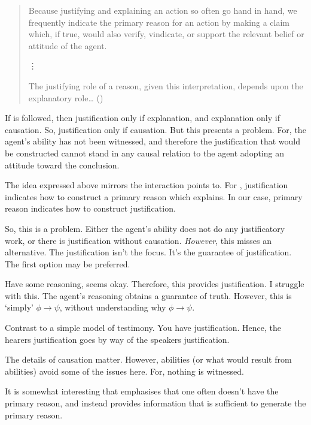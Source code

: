 \documentclass[10pt]{article}
\begin{document}
\begin{note}[Davidson]
  \begin{quote}
    Because justifying and explaining an action so often go hand in hand, we frequently indicate the primary reason for an action by making a claim which, if true, would also verify, vindicate, or support the relevant belief or attitude of the agent.

    \vdots

    The justifying role of a reason, given this interpretation, depends upon the explanatory role\dots
    \nolinebreak
    \mbox{}\hfill(\cite[8]{Davidson:2001aa})
  \end{quote}

  If \citeauthor{Davidson:2001aa} is followed, then justification only if explanation, and explanation only if causation.
  So, justification only if causation.
  But this presents a problem.
  For, the agent's ability has not been witnessed, and therefore the justification that would be constructed cannot stand in any causal relation to the agent adopting an attitude toward the conclusion.

  The idea expressed above mirrors the interaction \citeauthor{Davidson:2001aa} points to.
  For \citeauthor{Davidson:2001aa}, justification indicates how to construct a primary reason which explains.
  In our case, primary reason indicates how to construct justification.

  So, this is a problem.
  {
    \color{red}
    Either the agent's ability does not do any justificatory work, or there is justification without causation.
    \emph{However}, this misses an alternative.
    The justification isn't the focus.
    It's the guarantee of justification.
  }
  The first option may be preferred.

  Have some reasoning, seems okay.
  Therefore, this provides justification.
  I struggle with this.
  The agent's reasoning obtains a guarantee of truth.
  However, this is `simply' \(\phi \rightarrow \psi\), without understanding why \(\phi \rightarrow \psi\).

  Contrast to a simple model of testimony.
  You have justification.
  Hence, the hearers justification goes by way of the speakers justification.

  The details of causation matter.
  However, abilities (or what would result from abilities) avoid some of the issues here.
  For, nothing is witnessed.

  It is somewhat interesting that \citeauthor{Davidson:2001aa} emphasises that one often doesn't have the primary reason, and instead provides information that is sufficient to generate the primary reason.


\end{note}
\end{document}
